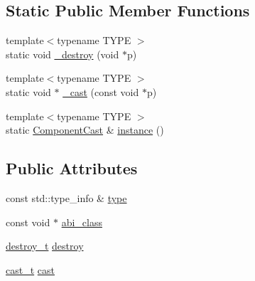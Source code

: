\subsection*{Static Public Member Functions}
\begin{DoxyCompactItemize}
\item 
{\footnotesize template$<$typename T\+Y\+PE $>$ }\\static void \hyperlink{class_d_d4hep_1_1_component_cast_a620db98421c9163d0fbc7192e60493d2}{\+\_\+destroy} (void $\ast$p)
\item 
{\footnotesize template$<$typename T\+Y\+PE $>$ }\\static void $\ast$ \hyperlink{class_d_d4hep_1_1_component_cast_afe17c403d3ff099be1d8b49fb3821d30}{\+\_\+cast} (const void $\ast$p)
\item 
{\footnotesize template$<$typename T\+Y\+PE $>$ }\\static \hyperlink{class_d_d4hep_1_1_component_cast}{Component\+Cast} \& \hyperlink{class_d_d4hep_1_1_component_cast_a006ce4ac1df92fed1bf93fbe95227262}{instance} ()
\end{DoxyCompactItemize}
\subsection*{Public Attributes}
\begin{DoxyCompactItemize}
\item 
const std\+::type\+\_\+info \& \hyperlink{class_d_d4hep_1_1_component_cast_a984d18ed863fe54855cf3308560270f0}{type}
\item 
const void $\ast$ \hyperlink{class_d_d4hep_1_1_component_cast_ae8cce3fcc69745f330272a49d51024dd}{abi\+\_\+class}
\item 
\hyperlink{class_d_d4hep_1_1_component_cast_a846aa2764437b52901326d56a1092c59}{destroy\+\_\+t} \hyperlink{class_d_d4hep_1_1_component_cast_af161de076d882540309e24d86ef50137}{destroy}
\item 
\hyperlink{class_d_d4hep_1_1_component_cast_af22751cad5f2f61dbae30c26c91ac621}{cast\+\_\+t} \hyperlink{class_d_d4hep_1_1_component_cast_a2f6cd06755e613e3f02c5302361d7024}{cast}
\end{DoxyCompactItemize}
